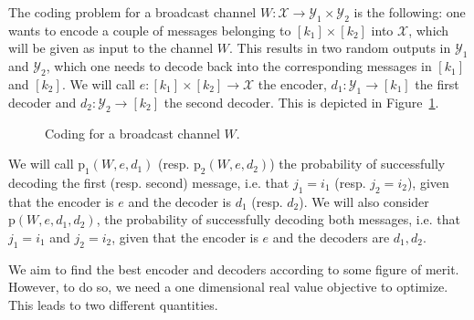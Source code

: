 The coding problem for a broadcast channel $W : \mathcal{X} \rightarrow \mathcal{Y}_1 \times \mathcal{Y}_2$ is the following: one wants to encode a couple of messages belonging to $[k_1] \times [k_2]$ into $\mathcal{X}$, which will be given as input to the channel $W$. This results in two random outputs in $\mathcal{Y}_1$ and $\mathcal{Y}_2$, which one needs to decode back into the corresponding messages in $[k_1]$ and $[k_2]$. We will call $e : [k_1] \times [k_2] \rightarrow \mathcal{X}$ the encoder, $d_1 : \mathcal{Y}_1 \rightarrow [k_1]$ the first decoder and $d_2 : \mathcal{Y}_2 \rightarrow [k_2]$ the second decoder. This is depicted in Figure~\ref{fig:BCcoding}.

\begin{figure}[!h]
\begin{center}
\end{center}
\caption{Coding for a broadcast channel $W$.}
\label{fig:BCcoding}
\end{figure}

We will call $\mathrm{p}_1(W,e,d_1)$ (resp. $\mathrm{p}_2(W,e,d_2)$) the probability of successfully decoding the first (resp. second) message, i.e. that $j_1 = i_1$ (resp. $j_2 = i_2$), given that the encoder is $e$ and the decoder is $d_1$ (resp. $d_2$). We will also consider $\mathrm{p}(W,e,d_1,d_2)$, the probability of successfully decoding both messages, i.e. that $j_1 = i_1$ and  $j_2 = i_2$, given that the encoder is $e$ and the decoders are $d_1,d_2$.

We aim to find the best encoder and decoders according to some figure of merit. However, to do so, we need a one dimensional real value objective to optimize. This leads to two different quantities.

